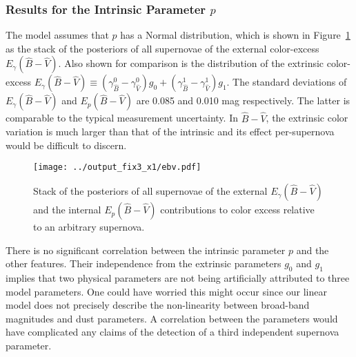 \documentclass[trackchanges]{aastex61}   	%
\begin{document}
{\subsubsection{Results for the Intrinsic Parameter $p$}
\label{p:sec}
The model assumes that $p$ has a Normal distribution, which is shown in Figure~\ref{ebv3:fig} as the 
stack of the posteriors of all supernovae of the external color-excess $E_{\gamma}({\hat{B}}-{\hat{V}})$.
Also shown for comparison is the distribution of
the extrinsic  color-excess $E_\gamma({\hat{B}}-{\hat{V}}) \equiv (\gamma^0_{\hat{B}} -\gamma^0_{\hat{V}}) g_0
+ (\gamma^1_{\hat{B}} -\gamma^1_{\hat{V}}) g_1$.
The standard deviations of  $E_\gamma({\hat{B}}-{\hat{V}})$ and $E_p({\hat{B}}-{\hat{V}})$ are
0.085 %
and 0.010
mag respectively.
The latter is comparable to the typical measurement uncertainty.
In $\hat{B}-\hat{V}$, 
the extrinsic color variation is much larger than that of the intrinsic and its effect per-supernova would be difficult to discern.

\begin{figure}[htbp] %
   \centering
   \texttt{[image: ../output\_fix3\_x1/ebv.pdf]}
      \caption{Stack of the posteriors of all supernovae of the external $E_{\gamma}({\hat{B}}-{\hat{V}})$ 
      and the 
   internal $E_p({\hat{B}}-{\hat{V}})$  contributions to color excess relative to an arbitrary supernova.
   \label{ebv3:fig}}
\end{figure}


There is no significant correlation between the  intrinsic parameter $p$ and the other features.
Their independence from the  extrinsic parameters $g_0$ and $g_1$
implies that two physical parameters are not being artificially attributed to three
model parameters.  One could have
worried this might
occur since our linear model does not precisely
describe the non-linearity between broad-band magnitudes and dust parameters. A
correlation 
between the parameters would have complicated any claims of the detection of a third independent supernova parameter.

}
\end{document}

